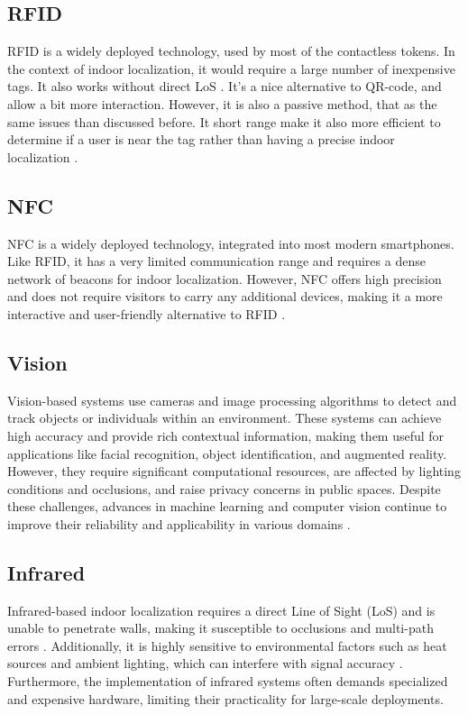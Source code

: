 \subsection{RFID}

RFID is a widely deployed technology, used by most of the contactless tokens. In the context of indoor localization, it would require a large number of inexpensive tags. It also works without direct LoS \cite{mainetti_survey_2014}. It's a nice alternative to QR-code, and allow a bit more interaction. However, it is also a passive method, that as the same issues than discussed before. It short range make it also more efficient to determine if a user is near the tag rather than having a precise indoor localization \cite{shang_overview_2022}. 

\subsection{NFC}

NFC is a widely deployed technology, integrated into most modern smartphones. Like RFID, it has a very limited communication range and requires a dense network of beacons for indoor localization. However, NFC offers high precision and does not require visitors to carry any additional devices, making it a more interactive and user-friendly alternative to RFID \cite{cai_museum_2015}. 

\subsection{Vision}

Vision-based systems use cameras and image processing algorithms to detect and track objects or individuals within an environment. These systems can achieve high accuracy and provide rich contextual information, making them useful for applications like facial recognition, object identification, and augmented reality. However, they require significant computational resources, are affected by lighting conditions and occlusions, and raise privacy concerns in public spaces. Despite these challenges, advances in machine learning and computer vision continue to improve their reliability and applicability in various domains \cite{mainetti_survey_2014}. 

\subsection{Infrared}

Infrared-based indoor localization requires a direct Line of Sight (LoS) and is unable to penetrate walls, making it susceptible to occlusions and multi-path errors \cite{mainetti_survey_2014}. Additionally, it is highly sensitive to environmental factors such as heat sources and ambient lighting, which can interfere with signal accuracy \cite{shang_overview_2022}. Furthermore, the implementation of infrared systems often demands specialized and expensive hardware, limiting their practicality for large-scale deployments.

